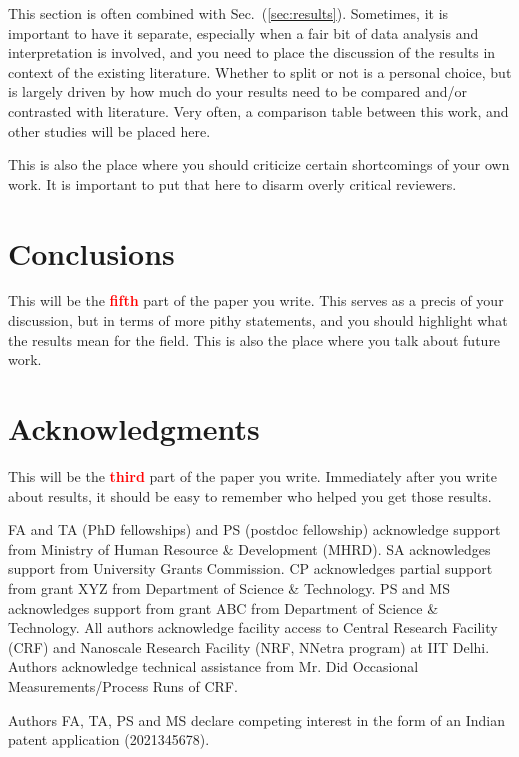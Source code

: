 \documentclass[12 pt]{article}
\begin{document}
This section is often combined with Sec.~(\ref{sec:results}). Sometimes, it is important to have it separate, especially when a fair bit of data analysis and interpretation is involved, and you need to place the discussion of the results in context of the existing literature. Whether to split or not is a personal choice, but is largely driven by how much do your results need to be compared and/or contrasted with literature. Very often, a comparison table between this work, and other studies will be placed here.

This is also the place where you should criticize certain shortcomings of your own work. It is important to put that here to disarm overly critical reviewers.

\section{Conclusions}
\label{sec:conclusions}

This will be the \textbf{\Huge \textcolor{red}{fifth}} part of the paper you write. This serves as a precis of your discussion, but in terms of more pithy statements, and you should highlight what the results mean for the field. This is also the place where you talk about future work.

\section*{Acknowledgments}

This will be the \textbf{\Huge \textcolor{red}{third}} part of the paper you write. Immediately after you write about results, it should be easy to remember who helped you get those results.

FA and TA (PhD fellowships) and PS (postdoc fellowship) acknowledge support from Ministry of Human Resource \& Development (MHRD). SA acknowledges support from University Grants Commission. CP acknowledges partial support from grant XYZ from Department of Science \& Technology. PS and MS acknowledges support from grant ABC from Department of Science \& Technology. All authors acknowledge facility access to Central Research Facility (CRF) and Nanoscale Research Facility (NRF, NNetra program) at IIT Delhi. Authors acknowledge technical assistance from Mr. Did Occasional Measurements/Process Runs of CRF.

Authors FA, TA, PS and MS declare competing interest in the form of an Indian patent application (2021345678).

\printbibliography
\end{document}

